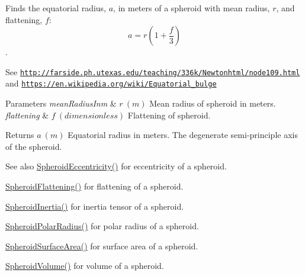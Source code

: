 Finds the equatorial radius, $a$, in meters of a spheroid with mean radius, $r$, and flattening, $f$\+: \[ a = r \left (1 + \dfrac{f}{3} \right ) \]. 

See \href{http://farside.ph.utexas.edu/teaching/336k/Newtonhtml/node109.html}{\tt http\+://farside.\+ph.\+utexas.\+edu/teaching/336k/\+Newtonhtml/node109.\+html} and \href{https://en.wikipedia.org/wiki/Equatorial_bulge}{\tt https\+://en.\+wikipedia.\+org/wiki/\+Equatorial\+\_\+bulge} 
\begin{DoxyParams}{Parameters}
{\em mean\+Radius\+Inm} & $ r\ (m)$ Mean radius of spheroid in meters. \\
\hline
{\em flattening} & $ f\ (dimensionless)$ Flattening of spheroid. \\
\hline
\end{DoxyParams}
\begin{DoxyReturn}{Returns}
$ a\ (m)$ Equatorial radius in meters. The degenerate semi-\/principle axis of the spheroid. 
\end{DoxyReturn}
\begin{DoxySeeAlso}{See also}
\mbox{\hyperlink{group___e_g_x_math-_geometry-3_d-_spheroid-_eccentricity_gab45680528a41bb7a5e15ddc0059156dd}{Spheroid\+Eccentricity()}} for eccentricity of a spheroid. 

\mbox{\hyperlink{group___e_g_x_math-_geometry-3_d-_spheroid-_flattening_ga05e3be91f5f7fbaa9371687aa3834179}{Spheroid\+Flattening()}} for flattening of a spheroid. 

\mbox{\hyperlink{group___e_g_x_math-_geometry-3_d-_spheroid-_inertia_ga4a6085f1b3504bd682ee6818542ae09e}{Spheroid\+Inertia()}} for inertia tensor of a spheroid. 

\mbox{\hyperlink{group___e_g_x_math-_geometry-3_d-_spheroid-_polar_radius_gad4791a46a7efe39c63c03d2366fdd3d2}{Spheroid\+Polar\+Radius()}} for polar radius of a spheroid. 

\mbox{\hyperlink{group___e_g_x_math-_geometry-3_d-_spheroid-_surface_area_ga5a3580e7ded82cb678a558905f41ae49}{Spheroid\+Surface\+Area()}} for surface area of a spheroid. 

\mbox{\hyperlink{group___e_g_x_math-_geometry-3_d-_spheroid-_volume_ga12125484235e94b8f2580f3476b05b92}{Spheroid\+Volume()}} for volume of a spheroid. 
\end{DoxySeeAlso}
